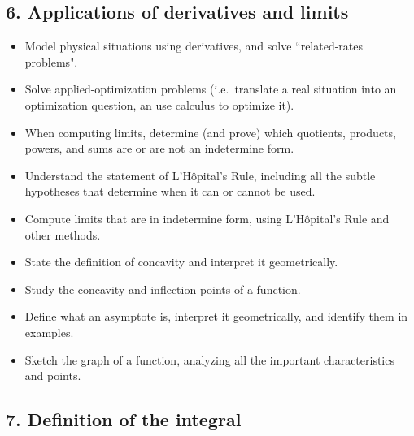 \documentclass[11pt]{article}
\begin{document}
	\subsection{6. Applications of derivatives and limits}

	\begin{itemize}
		\item Model physical situations using derivatives, and solve ``related-rates
			problems".

		\item Solve applied-optimization problems (i.e.\ translate a real situation into
			an optimization question, an use calculus to optimize it).

		\item When computing limits, determine (and prove) which quotients, products,
			powers, and sums are or are not an indetermine form.

		\item Understand the statement of L'H\^{o}pital's Rule, including all the subtle
			hypotheses that determine when it can or cannot be used.

		\item Compute limits that are in indetermine form, using L'H\^{o}pital's Rule
			and other methods.

		\item State the definition of concavity and interpret it geometrically.

		\item Study the concavity and inflection points of a function.

		\item Define what an asymptote is, interpret it geometrically, and identify them
			in examples.

		\item Sketch the graph of a function, analyzing all the important
			characteristics and points.
	\end{itemize}

	\subsection{7. Definition of the integral}
\end{document}
